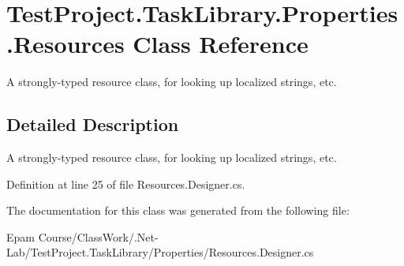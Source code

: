 \hypertarget{class_test_project_1_1_task_library_1_1_properties_1_1_resources}{}\section{Test\+Project.\+Task\+Library.\+Properties.\+Resources Class Reference}
\label{class_test_project_1_1_task_library_1_1_properties_1_1_resources}


A strongly-\/typed resource class, for looking up localized strings, etc.  




\subsection{Detailed Description}
A strongly-\/typed resource class, for looking up localized strings, etc. 



Definition at line 25 of file Resources.\+Designer.\+cs.



The documentation for this class was generated from the following file\+:\begin{DoxyCompactItemize}
\item 
Epam Course/\+Class\+Work/.\+Net-\/\+Lab/\+Test\+Project.\+Task\+Library/\+Properties/Resources.\+Designer.\+cs\end{DoxyCompactItemize}
